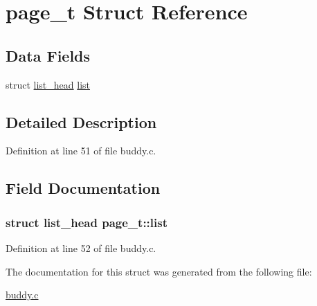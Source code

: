 \hypertarget{structpage__t}{}\section{page\+\_\+t Struct Reference}
\label{structpage__t}
\subsection*{Data Fields}
\begin{DoxyCompactItemize}
\item 
struct \hyperlink{structlist__head}{list\+\_\+head} \hyperlink{structpage__t_a97306c6fff4f6280e8e8049412091475}{list}
\end{DoxyCompactItemize}


\subsection{Detailed Description}


Definition at line 51 of file buddy.\+c.



\subsection{Field Documentation}
\subsubsection[{\texorpdfstring{list}{list}}]{\setlength{\rightskip}{0pt plus 5cm}struct {\bf list\+\_\+head} page\+\_\+t\+::list}\hypertarget{structpage__t_a97306c6fff4f6280e8e8049412091475}{}\label{structpage__t_a97306c6fff4f6280e8e8049412091475}


Definition at line 52 of file buddy.\+c.



The documentation for this struct was generated from the following file\+:\begin{DoxyCompactItemize}
\item 
\hyperlink{buddy_8c}{buddy.\+c}\end{DoxyCompactItemize}
